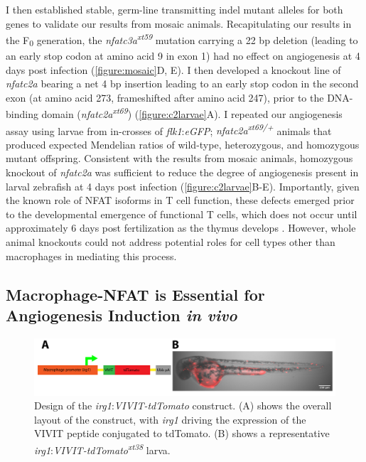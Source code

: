 I then established stable, germ-line transmitting indel mutant alleles for both genes to validate our results from mosaic animals. Recapitulating our results in the F\textsubscript{0} generation, the \textit{nfatc3a\textsuperscript{xt59}} mutation carrying a 22 bp deletion (leading to an early stop codon at amino acid 9 in exon 1) had no effect on angiogenesis at 4 days post infection (\autoref{figure:mosaic}D, E). I then developed a knockout line of \textit{nfatc2a} bearing a net 4 bp insertion leading to an early stop codon in the second exon (at amino acid 273, frameshifted after amino acid 247), prior to the DNA\hyp{}binding domain (\textit{nfatc2a\textsuperscript{xt69}}) (\autoref{figure:c2larvae}A). I repeated our angiogenesis assay using larvae from in-crosses of \textit{flk1}:\textit{eGFP}; \textit{nfatc2a\textsuperscript{xt69/+}} animals that produced expected Mendelian ratios of wild\hyp{}type, heterozygous, and homozygous mutant offspring. Consistent with the results from mosaic animals, homozygous knockout of \textit{nfatc2a} was sufficient to reduce the degree of angiogenesis present in larval zebrafish at 4 days post infection (\autoref{figure:c2larvae}B\hyp{}E). Importantly, given the known role of NFAT isoforms in T cell function, these defects emerged prior to the developmental emergence of functional T cells, which does not occur until approximately 6 days post fertilization as the thymus develops \citep{Trede2004}. However, whole animal knockouts could not address potential roles for cell types other than macrophages in mediating this process. 

\subsection{Macrophage\hyp{}NFAT is Essential for Angiogenesis Induction \textit{in vivo}}

\begin{figure}
\centering
\includegraphics[width=\textwidth]{images/vivitconstruct.pdf}
\caption[Design of \textit{irg1}:\textit{VIVIT\hyp{}tdTomato}]{Design of the \textit{irg1}:\textit{VIVIT\hyp{}tdTomato} construct. (A) shows the overall layout of the construct, with \textit{irg1} driving the expression of the VIVIT peptide conjugated to tdTomato. (B) shows a representative \textit{irg1}:\textit{VIVIT\hyp{}tdTomato\textsuperscript{xt38}} larva.}
\label{figure:vivitdiagram}
\end{figure}

